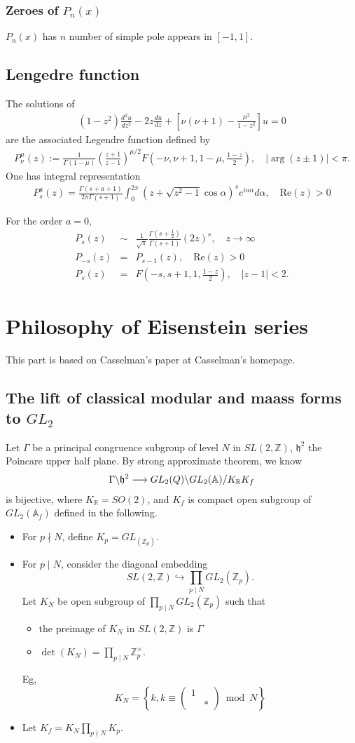 \documentclass[11pt,reqno]{amsart}
\newcommand{\bea}{\begin{eqnarray}}
\newcommand{\eea}{\end{eqnarray}}
\newcommand{\bna}{\begin{eqnarray*}}
\newcommand{\ena}{\end{eqnarray*}}
\newcommand{\bma}{\begin{pmatrix}}
\newcommand{\ema}{\end{pmatrix}}
\def\re{{\mathrm{Re}}}
\def\Q{\mathbb{Q}}
\def\Z{\mathbb{Z}}
\theoremstyle{definition}
\newcommand{\bit}{\begin{itemize}}
\newcommand{\eit}{\end{itemize}}
\begin{document}
\subsubsection{Zeroes of $P_n(x)$}
$P_n(x)$ has $n$ number of simple pole appears in $[-1,1]$.

\subsection{Lengedre function}
The solutions of
\bna
(1-z^2)\frac{d^2u}{dz^2}-2z\frac{du}{dz}+[\nu(\nu+1)-\frac{\mu^2}{1-z^2}]u=0
\ena
are the associated Legendre function defined by
\bna
P_\nu^\mu(z):=\frac{1}{\Gamma(1-\mu)}\left(\frac{z+1}{z-1}\right)^{\mu/2}
F(-\nu,\nu+1,1-\mu,\frac{1-z}{2}),
\quad |\arg(z\pm 1)|<\pi.
\ena
One has integral representation
\bna
P_s^a(z)=
\frac{\Gamma(s+a+1)}{2\pi\Gamma(s+1)}\int_0^{2\pi} (z+\sqrt{z^2-1}\cos\alpha)^s
e^{ia\alpha}d\alpha,\quad \re(z)>0
\ena

For the order $a=0$,
\bna
P_s(z)&\sim&\frac{1}{\sqrt{\pi}}\frac{\Gamma(s+\frac{1}{2})}{\Gamma(s+1)} (2z)^s,\quad z\rightarrow\infty\\
P_{-s}(z)&=&P_{s-1}(z),\quad \re(z)>0\\
P_s(z)&=&F(-s,s+1,1,\frac{1-z}{2}),\quad |z-1|<2.
\ena


\section{Philosophy of Eisenstein series}\label{Sec-Eisenstein}
This part is based on Casselman's paper at Casselman's homepage.

\subsection{The lift of classical modular and maass forms to $GL_2$}\label{section-lift}
Let $\Gamma$ be a principal congruence subgroup of level $N$ in $SL(2,\mathbb Z)$, $\mathfrak h^2$ the Poincare
upper half plane. By strong approximate theorem, we know
\bea
\Gamma\backslash \mathfrak h^2\longrightarrow GL_2(\mathbb \Q)\backslash GL_2(\mathbb A)/K_\mathbb R K_f
\label{strong-approximate-formula}
\eea
is bijective,
where $K_\mathbb R=SO(2)$, and $K_f$ is compact open subgroup of $GL_2(\mathbb A_f)$ defined in the following.
\begin{itemize}
\item For $p\nmid N$, define $K_p=GL_(\Z_p)$.
\item For $p\mid N$, consider the diagonal embedding
$$
SL(2,\Z)\hookrightarrow \prod_{p\mid N}GL_2(\Z_p).
$$
Let $K_N$ be open subgroup of $\prod_{p\mid N}GL_2(\Z_p)$ such that
\bit
\item the preimage of $K_N$ in $SL(2,\Z)$ is $\Gamma$
\item $\det\left(K_N\right)=\prod_{p\mid N}\mathbb Z_p^\times$.
\eit
Eg, $$K_N=\left\{k, k\equiv \bma 1&\\&*\ema\bmod N\right\}$$
\item Let $K_f=K_N\prod_{p\nmid N}K_p$.
\end{itemize}
\end{document}
